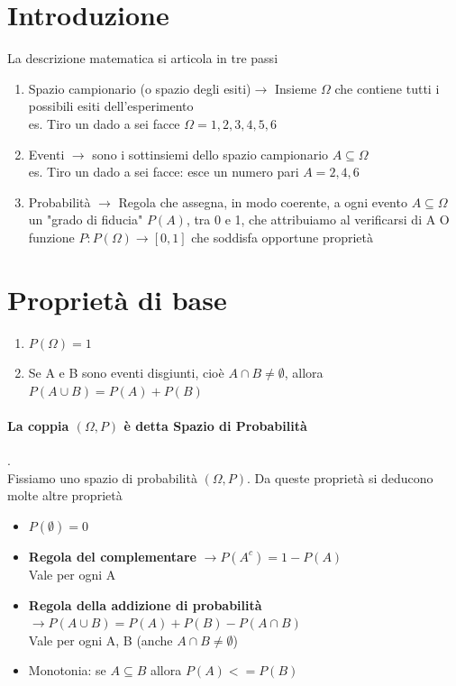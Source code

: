 \documentclass[12pt, a4paper, openany]{book}
\begin{document}
\section{Introduzione}
La descrizione matematica si articola in tre passi
\begin{enumerate}
    \item Spazio campionario (o spazio degli esiti)$\to$ Insieme $\Omega$ che contiene tutti i possibili esiti dell'esperimento \\ es. Tiro un dado a sei facce $\Omega = {1, 2, 3, 4, 5, 6}$
    \item Eventi $\to$ sono i sottinsiemi dello spazio campionario $A \subseteq \Omega$ \\ es. Tiro un dado a sei facce: esce un numero pari $A = {2, 4, 6}$
    \item Probabilità $\to$ Regola che assegna, in modo coerente, a ogni evento $A \subseteq \Omega$ un "grado di fiducia" $P(A)$, tra 0 e 1, che attribuiamo al verificarsi di A
    O funzione $P: P(\Omega) \to [0, 1]$ che soddisfa opportune proprietà
\end{enumerate}
\section{Proprietà di base} 
\begin{enumerate}
    \item $P(\Omega) = 1$
    \item Se A e B sono eventi disgiunti, cioè $A \cap B \neq \emptyset$, allora \\ $P (A \cup B) = P(A) + P(B)$
\end{enumerate}
\paragraph{La coppia $(\Omega, P)$ è detta \textbf{Spazio di Probabilità}}.
\\ Fissiamo uno spazio di probabilità $(\Omega, P)$.
Da queste proprietà si deducono molte altre proprietà
\begin{itemize}
    \item $P(\emptyset) = 0$
    \item \textbf{Regola del complementare} $\to P(A^c) = 1 - P(A)$ \\ Vale per ogni A
    \item \textbf{Regola della addizione di probabilità} $\to P(A \cup B) = P(A) + P(B) - P(A \cap B)$ 
    \\ Vale per ogni A, B (anche $A \cap B \neq \emptyset$)
    \item Monotonia: se $A \subseteq B$ allora $P(A) <= P(B)$
\end{itemize}
\end{document}
